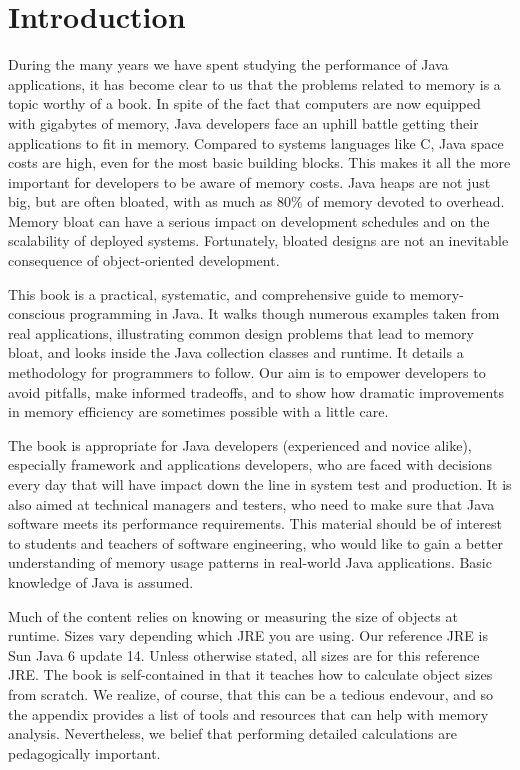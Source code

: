 \chapter{Introduction}


During the many years we have spent studying the performance of Java applications, it has become clear to us that the problems related to memory is a topic worthy of a book.
In spite of the fact that computers are now equipped with gigabytes of memory, Java developers face an uphill battle getting their applications to fit in memory.  Compared to systems languages like C, Java space costs are high, even for the most basic building blocks. This makes it all the more important for developers to be aware of memory costs.  Java heaps are not just big, but are often bloated, with as much as 80\% of memory devoted to overhead. Memory bloat can have a serious impact on development schedules and on the scalability of deployed systems. Fortunately, bloated designs are not an inevitable consequence of object-oriented development.

This book is a practical, systematic, and comprehensive guide to memory-conscious programming in Java. It walks though numerous examples taken from real applications, illustrating common design problems that lead to memory bloat, and looks inside the Java collection classes and runtime. It details a methodology for programmers to follow. Our aim is to empower developers to avoid pitfalls, make informed tradeoffs, and to show how dramatic improvements in memory efficiency are sometimes possible with a little care.

The book is appropriate for Java developers (experienced and novice alike), especially framework and applications developers, who are faced with decisions every day that will have impact down the line in system test and production. It is also aimed at technical managers and testers, who need to make sure that Java software meets its performance requirements.  This material should be of interest to students and teachers of software engineering, who would like to gain a better understanding of memory usage patterns in real-world Java applications. Basic knowledge of Java is assumed.

Much of the content relies on knowing or measuring the size of objects at runtime. Sizes vary depending which JRE you are using. Our reference JRE is Sun Java 6 update 14. Unless otherwise stated, all sizes are for this reference JRE. The book is self-contained in that it teaches how to calculate object sizes from scratch. We realize, of course, that this can be a tedious endevour, and so the appendix provides a list of tools and resources that can help with memory analysis. Nevertheless, we belief that performing detailed calculations are pedagogically important. 

